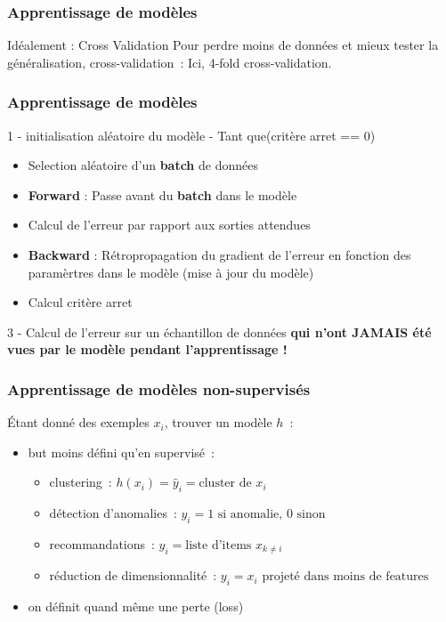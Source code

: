 \documentclass{formation}
\begin{document}
\begin{frame}
  \frametitle{Apprentissage de modèles}
  Idéalement : Cross Validation
  Pour \og perdre\fg{} moins de données et mieux tester la
  généralisation, cross-validation :
  Ici, 4-fold cross-validation.
\end{frame}

\begin{frame}
  \frametitle{Apprentissage de modèles}
  1 - initialisation aléatoire du modèle
   - Tant que(critère arret == 0)
  \begin{itemize}
  \item Selection aléatoire d'un \textbf{batch} de données
  \item \textbf{Forward} : Passe avant du \textbf{batch} dans le modèle
  \item Calcul de l'erreur par rapport aux sorties attendues
  \item \textbf{Backward} : Rétropropagation du gradient de l'erreur en fonction des paramèrtres dans le modèle (mise à jour du modèle)
  \item Calcul critère arret
  \end{itemize}
  3 - Calcul de l'erreur sur un échantillon de données  \textbf{qui n'ont JAMAIS été vues par le modèle pendant l'apprentissage !}
\end{frame}

\begin{frame}
  \frametitle{Apprentissage de modèles non-supervisés}
  Étant donné des exemples $x_i$, trouver un modèle $h$ :
  \begin{itemize}[<+->]
  \item but moins défini qu'en supervisé :
    \begin{itemize}[<+->]
    \item clustering : $h(x_i) = \hat{y}_i = \text{cluster de }x_i$
    \item détection d'anomalies : $y_i = 1 \text{ si anomalie, }0
      \text{ sinon}$
    \item recommandations : $y_i = \text{liste d'items }x_{k\neq i}$
    \item réduction de dimensionnalité : $y_i = x_i \text{ projeté dans
      moins de features}$
    \end{itemize}
  \item on définit quand même une perte (loss) \\[.2cm]
    \\[.2cm]
    \\[.2cm]
  \end{itemize}
\end{frame}
\end{document}
